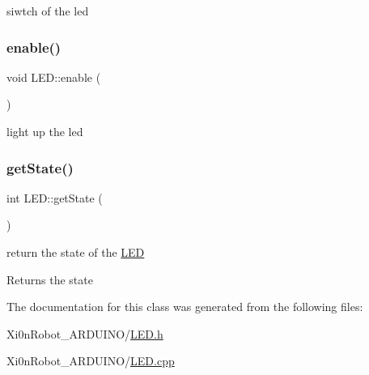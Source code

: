 siwtch of the led 

\mbox{\label{class_l_e_d_ad49b7b4dd1e4d8ad667da1be9ce7bcf5}} 
\subsubsection{\texorpdfstring{enable()}{enable()}}
{\footnotesize\ttfamily void L\+E\+D\+::enable (\begin{DoxyParamCaption}{ }\end{DoxyParamCaption})}



light up the led 

\mbox{\label{class_l_e_d_a856e5728756d749bc127e9383f2216a6}} 
\subsubsection{\texorpdfstring{get\+State()}{getState()}}
{\footnotesize\ttfamily int L\+E\+D\+::get\+State (\begin{DoxyParamCaption}{ }\end{DoxyParamCaption})}



return the state of the \hyperlink{class_l_e_d}{L\+ED} 

\begin{DoxyReturn}{Returns}
the state 
\end{DoxyReturn}


The documentation for this class was generated from the following files\+:\begin{DoxyCompactItemize}
\item 
Xi0n\+Robot\+\_\+\+A\+R\+D\+U\+I\+N\+O/\hyperlink{_l_e_d_8h}{L\+E\+D.\+h}\item 
Xi0n\+Robot\+\_\+\+A\+R\+D\+U\+I\+N\+O/\hyperlink{_l_e_d_8cpp}{L\+E\+D.\+cpp}\end{DoxyCompactItemize}
